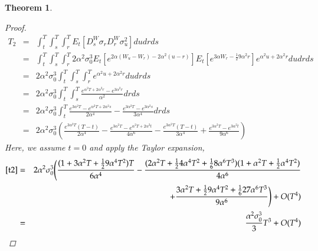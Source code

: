 \documentclass[11pt]{article}
\newtheorem{theorem}{Theorem}
\begin{document}
\begin{theorem}
\begin{proof}
\begin{eqnarray}
T_2 
&=& \int_{t}^{T} \int_{s}^{T} \int_{r}^{T} E_{t}\left[ D_{s}^{W}\sigma_{r}  D_{r}^{W}\sigma _{u}^{2} \right]du dr ds\nonumber\\
&=& \int_{t}^{T} \int_{s}^{T} \int_{r}^{T} 2\alpha^2 \sigma_0^3  E_{t}\left[ e^{2\alpha(W_u - W_r) - 2\alpha^2(u-r)}\right]E_{t}\left[ e^{3\alpha W_r - \frac12 9\alpha^2r}\right]e^{\alpha^2u + 2\alpha^2r}du dr ds\nonumber\\
&=& 2\alpha^2 \sigma_0^3 \int_{t}^{T} \int_{s}^{T} \int_{r}^{T} e^{\alpha^2u + 2\alpha^2r}du dr ds\nonumber\\
&=& 2\alpha^2 \sigma_0^3 \int_{t}^{T} \int_{s}^{T} \frac{e^{\alpha^2T + 2\alpha^2r} - e^{3\alpha^2r}}{\alpha^2} dr ds\nonumber\\
&=& 2\alpha^2 \sigma_0^3 \int_{t}^{T} \frac{e^{3\alpha^2T} - e^{\alpha^2T + 2\alpha^2s}}{2\alpha^4} - \frac{e^{3\alpha^2T} - e^{3\alpha^2s}}{3\alpha^4} dr ds\nonumber\\
&=& 2\alpha^2 \sigma_0^3 \left( \frac{e^{3\alpha^2T}(T-t)}{2\alpha^4} - \frac{e^{3\alpha^2T} - e^{\alpha^2T + 2\alpha^2t}}{4\alpha^6} - \frac{e^{3\alpha^2T}(T-t)}{3\alpha^4} + \frac{e^{3\alpha^2T} - e^{3\alpha^2t}}{9\alpha^6} \right)\label{t2}
\end{eqnarray}
Here, we assume $t=0$ and apply the Taylor expansion,
\begin{eqnarray}
\eqref{t2}
&=& 
2\alpha^2 \sigma_0^3  \Bigg(\frac{(1+3\alpha^2T+\frac{1}{2}9\alpha^4T^2)T}{6\alpha^4} - \frac{(2\alpha^2T + \frac{1}{2}4\alpha^4T^2 + \frac{1}{6}8\alpha^6T^3)(1 + \alpha^2T + \frac{1}{2}\alpha^4T^2)}{4\alpha^6}\nonumber\\
&& + \frac{3\alpha^2 T+ \frac{1}{2}9\alpha^4T^2+\frac{1}{6}27\alpha^6T^3}{9\alpha^6}\Bigg) +O(T^4)\nonumber\\
&=&
\frac{\alpha^2 \sigma_0^3}{3}T^3+O(T^4)
\end{eqnarray}


\end{proof}
\end{theorem}
\end{document}
